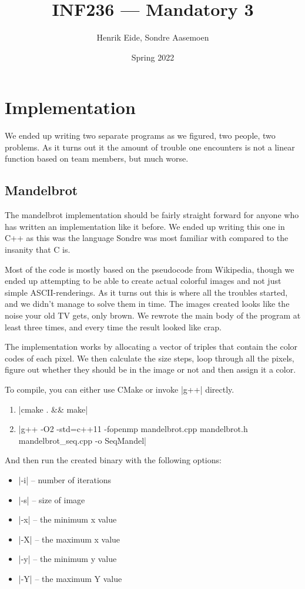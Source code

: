 \documentclass[12pt,a4paper,oneside,article]{memoir}
\title{INF236 --- Mandatory 3}
\author{Henrik Eide, Sondre Aasemoen}
\date{Spring 2022}
\numberwithin{equation}{chapter}
\begin{document}
\chapter{Implementation}

We ended up writing two separate programs as we figured, two people, two 
problems. As it turns out it the amount of trouble one encounters is not
a linear function based on team members, but much worse.

\section{Mandelbrot}

The mandelbrot implementation should be fairly straight forward for anyone 
who has written an implementation like it before. We ended up writing this 
one in C++ as this was the language Sondre was most familiar with compared 
to the insanity that C is.

Most of the code is mostly based on the pseudocode from Wikipedia, though
we ended up attempting to be able to create actual colorful images and 
not just simple ASCII-renderings. As it turns out this is where all the 
troubles started, and we didn't manage to solve them in time. The images
created looks like the noise your old TV gets, only brown. We rewrote the 
main body of the program at least three times, and every time the result
looked like crap.

The implementation works by allocating a vector of triples that contain
the color codes of each pixel. We then calculate the size steps, loop 
through all the pixels, figure out whether they should be in the image or 
not and then assign it a color.

To compile, you can either use CMake or invoke |g++| directly. 

\begin{enumerate}
  \item |cmake . && make|
  \item |g++ -O2 -std=c++11 -fopenmp mandelbrot.cpp mandelbrot.h mandelbrot_seq.cpp -o SeqMandel|
\end{enumerate}

And then run the created binary with the following options: 

\begin{itemize}
  \item |-i| -- number of iterations 
  \item |-s| -- size of image 
  \item |-x| -- the minimum x value
  \item |-X| -- the maximum x value
  \item |-y| -- the minimum y value
  \item |-Y| -- the maximum Y value
\end{itemize}
\end{document}
